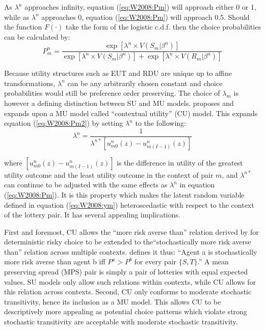 \documentclass[../main.tex]{subfiles}
\begin{document}
As $\lambda^n$ approaches infinity, equation (\ref{eq:W2008:Pm}) will approach either 0 or 1, while as $\lambda^n$ approaches 0, equation (\ref{eq:W2008:Pm}) will approach 0.5.
Should the function $F(\cdot)$ take the form of the logistic c.d.f. then the choice probabilities can be calculated by:
\begin{equation}
	\label{eq:W2008:Pm2}
	P_m^n = \frac{\exp \left[ \lambda^n \times V(S_m | \beta^n) \right]}{  \exp \left[ \lambda^n \times V(S_m | \beta^n) \right] + \exp \left[ \lambda^n \times V(R_m | \beta^n) \right] }
\end{equation}

Because utility structures such as EUT and RDU are unique up to affine transformations, $\lambda^n$ can be any arbitrarily chosen constant and choice probabilities would still be preference order preserving.
The choice of $\lambda_m$ is however a defining distinction between SU and MU models.
\textcite{Wilcox2008} proposes and \textcite{Wilcox2011} expands upon a MU model called \enquote{contextual utility} (CU) model. This expands equation (\ref{eq:W2008:Pm2}) by setting $\lambda^n$ to the following:
\begin{equation}
	\lambda^n = \frac{1}{\lambda^{n*} \left[ u^n_{m0}(z) - u^n_{m(I-1)}(z) \right]}
\end{equation}

\noindent where $\left[ u^n_{m0}(z) - u^n_{m(I-1)}(z) \right]$ is the difference in utility of the greatest utility outcome and the least utility outcome in the context of pair $m$, and $\lambda^{n*}$ can continue to be adjusted with the same effects as $\lambda^n$ in equation (\ref{eq:W2008:Pm}).
It is this property which makes the latent random variable defined in equation (\ref{eq:W2008:ym}) heteroscedastic with respect to the context of the lottery pair.
It has several appealing implications.

First and foremost, CU allows the \enquote{more risk averse than} relation derived by \textcite{Pratt1964} for deterministic risky choice to be extended to the\enquote{stochastically more risk averse than} relation across multiple contexts.
\textcite[89]{Wilcox2011} defines it thus: \enquote{Agent a is stochastically more risk averse than agent b \textelp{} iff $P^a > P^b$ for every  pair $\lbrace S, T \rbrace$.}
A mean preserving spread (MPS) pair is simply a pair of lotteries with equal expected values.
SU models only allow such relations within contexts, while CU allows for this relation across contexts.
Second, CU only conforms to moderate stochastic transitivity, hence its inclusion as a MU model.
This allows CU to be descriptively more appealing as potential choice patterns which violate strong stochastic transitivity are acceptable with moderate stochastic transitivity.
\end{document}
